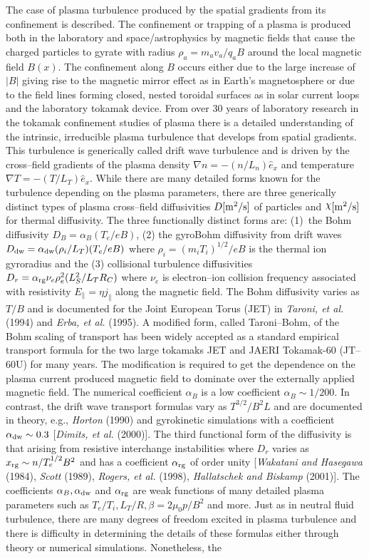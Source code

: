 \documentclass[a4paper,openany,12pt]{book}
\def\chix{\raise.5ex\hbox{$\chi$}}
\begin{document}
The case of plasma turbulence produced by the spatial gradients from its confinement is described. The confinement or trapping of a plasma is produced both in the laboratory and space/astrophysics by magnetic fields that cause the charged particles to gyrate with radius $\rho_a = m_a v_a /q_a B$ around the local magnetic field $B(x)$. The confinement along $B$ occurs either due to the large increase of $|B|$ giving rise to the magnetic mirror effect as in Earth's magnetosphere or due to the field lines forming closed, nested toroidal surfaces as in solar current loops and the laboratory tokamak device. From over 30 years of laboratory research in the tokamak confinement studies of plasma there is a detailed understanding of the intrinsic, irreducible plasma turbulence that develops from spatial gradients. This turbulence is generically called drift wave turbulence and is driven by the cross--field gradients of the plasma density $\nabla n=-(n/L_n)\widehat e_x$ and temperature $\nabla T=-(T/L_T)\widehat e_x$. While there are many detailed forms known for the turbulence depending on the plasma parameters, there are three generically distinct types of plasma cross--field diffusivities $D[\rm m^2/s]$ of particles and $\chix[\rm m^2/s]$ for thermal diffusivity. The three functionally distinct forms are: (1)~the Bohm diffusivity $D_B=\alpha_B(T_e/eB)$, (2) the gyroBohm diffusivity from drift waves $D_{\rm dw}=\alpha_{\rm dw}(\rho_i/L_T)(T_e/eB)$ where $\rho_i=(m_iT_i)^{1/2}/eB$ is the thermal ion gyroradius and the (3) collisional turbulence diffusivities $D_r=\alpha_{\rm rg}\nu_e\rho_e^2(L_S ^2/L_TR_C)$ where $\nu_e$ is electron--ion collision frequency associated with resistivity $E_\|=\eta j_\|$ along the magnetic field. The Bohm diffusivity varies as $T/B$ and is documented for the Joint European Torus (JET) in \emph{Taroni, et al.} (1994) and \emph{Erba, et al.} (1995). A modified form, called Taroni--Bohm, of the Bohm scaling of transport has been widely accepted as a standard empirical transport formula for the two large tokamaks JET and JAERI Tokamak-60 (JT--60U) for many years. The modification is required to get the dependence on the plasma current produced magnetic field to dominate over the externally applied magnetic field. The numerical coefficient $\alpha_B$ is a low coefficient $\alpha_B\sim 1/200$. In contrast, the drift wave transport formulas vary as $T^{3/2}/B^2L$ and are documented in theory, e.g., \emph{Horton} (1990) and gyrokinetic simulations with a coefficient $\alpha_{\rm dw}\sim 0.3$ [\emph{Dimits, et al.} (2000)]. The third functional form of the diffusivity is that arising from resistive interchange instabilities where $D_r$ varies as $x_{\rm rg}\sim n/T_e^{1/2}B^2$ and has a coefficient $\alpha_{\rm rg}$ of order unity [\emph{Wakatani and Hasegawa} (1984), \emph{Scott} (1989), \emph{Rogers, et al.} (1998), \emph{Hallatschek and Biskamp} (2001)]. The coefficients $\alpha_B, \alpha_{\rm dw}$ and $\alpha_{\rm rg}$ are weak functions of many detailed plasma parameters such as $T_e/T_i, L_T/R, \beta=2\mu_0p/B^2$ and more. Just as in neutral fluid turbulence, there are many degrees of freedom excited in plasma turbulence and there is difficulty in determining the details of these formulas either through theory or numerical simulations. Nonetheless, the 
\end{document}
